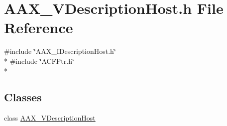 \hypertarget{a00305}{}\section{A\+A\+X\+\_\+\+V\+Description\+Host.\+h File Reference}
\label{a00305}
{\ttfamily \#include \char`\"{}A\+A\+X\+\_\+\+I\+Description\+Host.\+h\char`\"{}}\\*
{\ttfamily \#include \char`\"{}A\+C\+F\+Ptr.\+h\char`\"{}}\\*
\subsection*{Classes}
\begin{DoxyCompactItemize}
\item 
class \hyperlink{a00133}{A\+A\+X\+\_\+\+V\+Description\+Host}
\end{DoxyCompactItemize}
